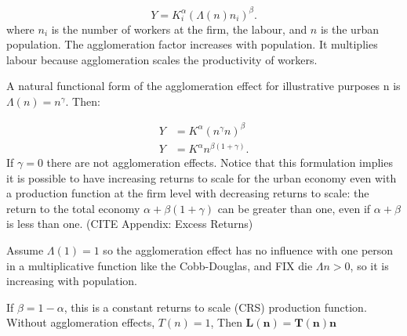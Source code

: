 \begin{equation} 
Y=K_i^{\alpha }(\Lambda(n)n_i)^{\beta }.
\label{Eqn:Prod1}
\end{equation} 
where $n_i$ is the number of workers at the firm, the labour, and $n$ is the urban population. The agglomeration factor increases with population. It multiplies labour because agglomeration scales the productivity of workers. 

A natural functional form of the agglomeration effect for illustrative purposes n is $\Lambda(n) = n^\gamma$. Then:

\begin{eqnarray}
 Y&=K^{\alpha }(n^{\gamma}n)^{\beta}  \nonumber\\
 Y&=K^{\alpha }n^{\beta(1 + \gamma)}.
 \label{Eqn:Prod2}
\end{eqnarray}
If $\gamma=0$ there are not agglomeration effects. Notice that  this formulation implies it is possible to have increasing returns to scale for the urban economy even with a production function at the firm level with decreasing returns to scale: the return to the total economy $\alpha + \beta(1 + \gamma)$ can be greater than one, even if $\alpha +\beta$ is less than one. %
(CITE Appendix: Excess Returns)

Assume $\Lambda(1)=1$ so the agglomeration effect has no influence with one person in a multiplicative function like the Cobb-Douglas, and %
FIX die ${\Lambda}{n}>0$, so it is increasing with population.

If $\beta=1-\alpha$, this is a constant returns to scale (CRS) production function. Without agglomeration effects, $T(n)=1$,  Then  \textbf{$\mathbf{L(n) = T(n) n}$} 



